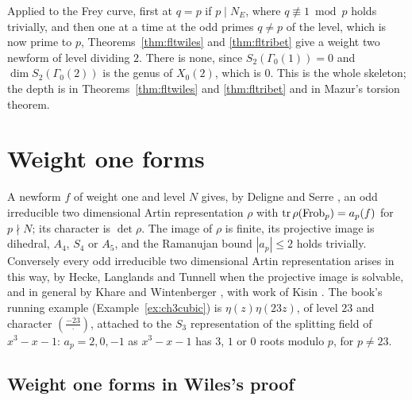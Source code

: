 Applied to the Frey curve, first at $q=p$ if $p\mid N_E$, where $q\not\equiv1\bmod p$ holds trivially, and then one at a time at the odd primes $q\ne p$ of the level, which is now prime to $p$, Theorems~\ref{thm:fltwiles} and \ref{thm:fltribet} give a weight two newform of level dividing $2$. There is none, since $S_2(\Gamma_0(1))=0$ and $\dim S_2(\Gamma_0(2))$ is the genus of $X_0(2)$, which is $0$. This is the whole skeleton; the depth is in Theorems~\ref{thm:fltwiles} and \ref{thm:fltribet} and in Mazur's torsion theorem.

\section{Weight one forms}\label{sec:fltweightone}

A newform $f$ of weight one and level $N$ gives, by Deligne and Serre \cite{deligneserre1974}, an odd irreducible two dimensional Artin representation $\rho$ with $\operatorname{tr}\rho(\operatorname{Frob}_p)=a_p(f)$ for $p\nmid N$; its character is $\det\rho$. The image of $\rho$ is finite, its projective image is dihedral, $A_4$, $S_4$ or $A_5$, and the Ramanujan bound $|a_p|\le2$ holds trivially. Conversely every odd irreducible two dimensional Artin representation arises in this way, by Hecke, Langlands and Tunnell \cite{langlands1980,tunnell1981} when the projective image is solvable, and in general by Khare and Wintenberger \cite{kharewintenberger2009,kharewintenberger2009b}, with work of Kisin \cite{kisin2009}. The book's running example (Example~\ref{ex:ch3cubic}) is $\eta(z)\eta(23z)$, of level $23$ and character $(\frac{-23}\cdot)$, attached to the $S_3$ representation of the splitting field of $x^3-x-1$: $a_p=2,0,-1$ as $x^3-x-1$ has $3$, $1$ or $0$ roots modulo $p$, for $p\ne23$.

\subsection{Weight one forms in Wiles's proof}

